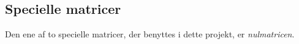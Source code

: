 \subsection{Specielle matricer} %

Den ene af to specielle matricer, der benyttes i dette projekt, er \textit{nulmatricen}. 